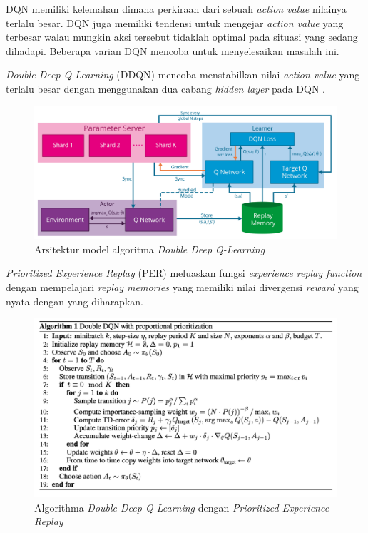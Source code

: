 DQN memiliki kelemahan dimana perkiraan dari sebuah \emph{action value} nilainya terlalu besar.
DQN juga memiliki tendensi untuk mengejar \emph{action value} yang terbesar walau mungkin aksi tersebut tidaklah optimal pada situasi yang sedang dihadapi.
Beberapa varian DQN mencoba untuk menyelesaikan masalah ini. 

\emph{Double Deep Q-Learning} (DDQN) mencoba menstabilkan nilai \emph{action value} yang terlalu besar dengan menggunakan dua cabang \emph{hidden layer} pada DQN \citep{doubleDQN}.

\begin{figure}[H]
  \centering
    \includegraphics[scale=0.2]{gambar/ddqn_architecture.png}
    \caption{Arsitektur model algoritma \emph{Double Deep Q-Learning}}
    \label{fig:ddqnArchitecture}
\end{figure}

\emph{Prioritized Experience Replay} (PER) meluaskan fungsi \emph{experience replay function} dengan mempelajari \emph{replay memories} yang memiliki nilai divergensi \emph{reward} yang nyata dengan yang diharapkan.\citep{prioritizedER}

\begin{figure}[H]
  \centering
    \includegraphics[scale=0.3]{gambar/ddqn_per_algorithm.png}
    \caption{Algorithma \emph{Double Deep Q-Learning} dengan \emph{Prioritized Experience Replay}}
    \label{fig:dqnPerAlgorithm}
\end{figure}

